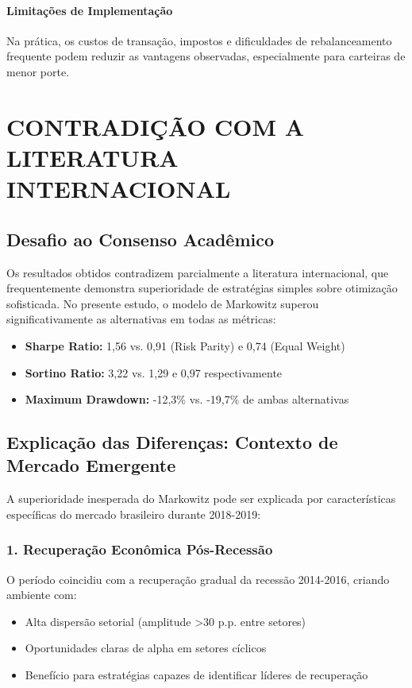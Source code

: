 \paragraph{Limitações de Implementação}
Na prática, os custos de transação, impostos e dificuldades de rebalanceamento frequente podem reduzir as vantagens observadas, especialmente para carteiras de menor porte.

\section{CONTRADIÇÃO COM A LITERATURA INTERNACIONAL}

\subsection{Desafio ao Consenso Acadêmico}

Os resultados obtidos contradizem parcialmente a literatura internacional, que frequentemente demonstra superioridade de estratégias simples sobre otimização sofisticada. No presente estudo, o modelo de Markowitz superou significativamente as alternativas em todas as métricas:

\begin{itemize}
    \item \textbf{Sharpe Ratio:} 1,56 vs. 0,91 (Risk Parity) e 0,74 (Equal Weight)
    \item \textbf{Sortino Ratio:} 3,22 vs. 1,29 e 0,97 respectivamente
    \item \textbf{Maximum Drawdown:} -12,3\% vs. -19,7\% de ambas alternativas
\end{itemize}

\subsection{Explicação das Diferenças: Contexto de Mercado Emergente}

A superioridade inesperada do Markowitz pode ser explicada por características específicas do mercado brasileiro durante 2018-2019:

\subsubsection{1. Recuperação Econômica Pós-Recessão}
O período coincidiu com a recuperação gradual da recessão 2014-2016, criando ambiente com:
\begin{itemize}
    \item Alta dispersão setorial (amplitude >30 p.p. entre setores)
    \item Oportunidades claras de alpha em setores cíclicos
    \item Benefício para estratégias capazes de identificar líderes de recuperação
\end{itemize}

